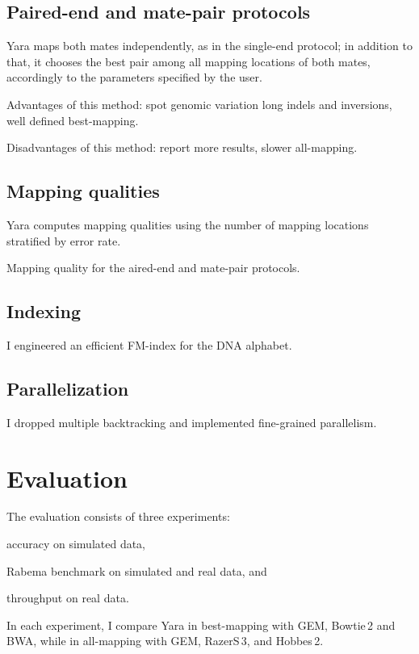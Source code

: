 \subsection{Paired-end and mate-pair protocols}

Yara maps both mates independently, as in the single-end protocol; in addition to that, it chooses the best pair among all mapping locations of both mates, accordingly to the parameters specified by the user.

Advantages of this method: spot genomic variation \eg long indels and inversions, well defined best-mapping.

Disadvantages of this method: report more results, slower all-mapping.

\subsection{Mapping qualities}

Yara computes mapping qualities using the number of mapping locations stratified by error rate.

Mapping quality for the aired-end and mate-pair protocols.

\subsection{Indexing}

I engineered an efficient FM-index for the DNA alphabet.

\subsection{Parallelization}

I dropped multiple backtracking and implemented fine-grained parallelism.



\section{Evaluation}

The evaluation consists of three experiments: \begin{inparaenum}[(i)]
\item accuracy on simulated data,
\item Rabema benchmark on simulated and real data, and
\item throughput on real data.
\end{inparaenum}
In each experiment, I compare Yara in best-mapping with GEM, Bowtie\,2 and BWA, while in all-mapping with GEM, RazerS\,3, and Hobbes\,2.


